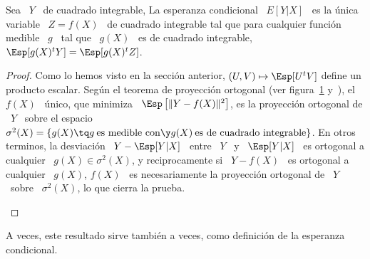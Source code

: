 \begin{corolario}
  Sea \ $Y$  \ de cuadrado integrable, La esperanza condicional  \ $E[Y|X]$ \ es
  la  \'unica variable  \  $Z =  f(X)$ \  de  cuadrado integrable  tal que  para
  cualquier  funci\'on medible  \  $g$  \ tal  que  \ $g(X)$  \  es de  cuadrado
  integrable, \ $\Esp[g(X)^tY] = \Esp[g(X)^t Z]$.
\end{corolario}
\begin{proof}
  Como  lo hemos visto  en la  secci\'on anterior,  $(U,V) \mapsto  \Esp[U^t V]$
  define un producto escalar.  Seg\'un el teorema de proyecci\'on ortogonal (ver
  figura~\ref{Fig:MP:TeoProyOrto}  y~\cite{JacPro03,   AthLah06,  toto}),  el  \
  $f(X)$ \ \'unico, que minimiza \ $\Esp\left[  \| Y - f(X) \|^2 \right]$, es la
  proyecci\'on ortogonal  de \ $Y$ \ sobre  el espacio \ $\sigma^2(X)  = \{ g(X)
  \tq g \: \mbox{es medible con} \y g(X) \: \mbox{es de cuadrado integrable}\}$.
  En otros  terminos, la  desviaci\'on \ $Y  - \Esp[Y|X]$  \ entre \  $Y$ \  y \
  $\Esp[Y|X]$  \  es   ortogonal  a  cualquier  \  $g(X)   \in  \sigma^2(X)$,  y
  reciprocamente si \ $Y  - f(X)$ \ es ortogonal a cualquier  \ $g(X)$, $f(X)$ \
  es necesariamente la proyecci\'on ortogonal  de \ $Y$ \ sobre \ $\sigma^2(X)$,
  lo que cierra la prueba.
\begin{figure}[h!]
  \begin{center}          \end{center}
\label{Fig:MP:TeoProyOrto}
\end{figure}
\end{proof}
%
A  veces,  este resultado  sirve  tambi\'en a  veces,  como  definici\'on de  la
esperanza condicional.